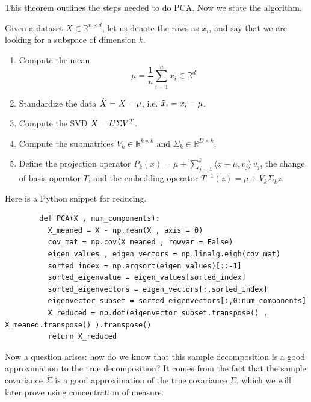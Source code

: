     This theorem outlines the steps needed to do PCA. Now we state the algorithm. 
    
    \begin{algo} 
      Given a dataset $X \in \mathbb{R}^{n \times d}$, let us denote the rows as $x_i$, and say that we are looking for a subspace of dimension $k$. 
      \begin{enumerate}
        \item Compute the mean 
        \begin{equation}
          \mu = \frac{1}{n} \sum_{i=1}^n x_i  \in \mathbb{R}^d
        \end{equation} 

        \item Standardize the data $\Tilde{X} = X - \mu$, i.e. $\Tilde{x}_i = x_i - \mu$.  

        \item Compute the SVD $\Tilde{X} = U \Sigma V^T$.

        \item Compute the submatrices $V_k \in \mathbb{R}^{k \times k}$ and $\Sigma_k \in \mathbb{R}^{D \times k}$. 

        \item Define the projection operator $P_k (x) = \mu + \sum_{j=1}^k \langle x - \mu, v_j \rangle \, v_j$, the change of basis operator $T$, and the embedding operator $T^{-1} (z) = \mu + V_k \Sigma_k z$. 
      \end{enumerate} 
    \end{algo}

    \begin{algo}
      Here is a Python snippet for reducing. 
      \begin{lstlisting}
        def PCA(X , num_components):
          X_meaned = X - np.mean(X , axis = 0)
          cov_mat = np.cov(X_meaned , rowvar = False)
          eigen_values , eigen_vectors = np.linalg.eigh(cov_mat)
          sorted_index = np.argsort(eigen_values)[::-1]
          sorted_eigenvalue = eigen_values[sorted_index]
          sorted_eigenvectors = eigen_vectors[:,sorted_index]
          eigenvector_subset = sorted_eigenvectors[:,0:num_components]
          X_reduced = np.dot(eigenvector_subset.transpose() , X_meaned.transpose() ).transpose()
          return X_reduced
      \end{lstlisting}
    \end{algo}

    Now a question arises: how do we know that this sample decomposition is a good approximation to the true decomposition? It comes from the fact that the sample covariance $\hat{\Sigma}$ is a good approximation of the true covariance $\Sigma$, which we will later prove using concentration of measure. 

